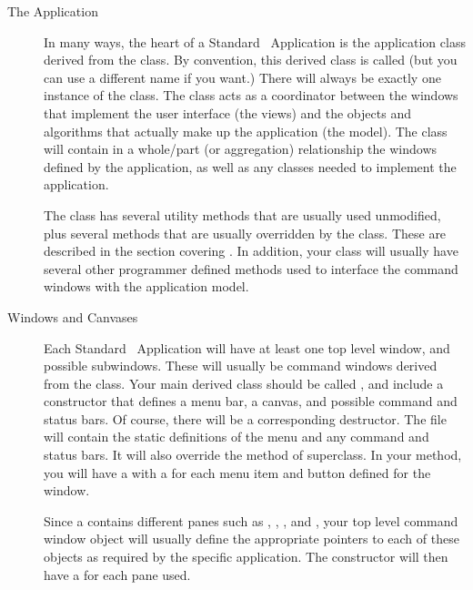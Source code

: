 \begin{description}

\item [The Application]

In many ways, the heart of a Standard \V\ Application is the
application class derived from the  class. By
convention, this derived class is called  (but you
can use a different name if you want.) There will always be
exactly one instance of the  class.  The 
class acts as a coordinator between the windows that implement
the user interface (the views) and the objects and algorithms
that actually make up the application (the model).  The 
class will contain in a whole/part (or aggregation) relationship
the windows defined by the application, as well as any classes
needed to implement the application.

The  class has several utility methods that are
usually used unmodified, plus several methods that are usually
overridden by the  class.  These are described in the
section covering .  In addition, your 
class will usually have several other programmer defined methods
used to interface the command windows with the application model.

\item [Windows and Canvases]

Each Standard \V\ Application will have at least one top level
window, and possible subwindows. These will usually be
command windows derived from the  class. Your
main derived class should be called , and
include a constructor that defines a menu bar, a canvas, and
possible command and status bars. Of course, there will be a
corresponding destructor. The  file will contain the
static definitions of the menu and any command and status bars.
It will also override the  method of 
superclass. In your  method, you will have a
 with a  for each menu item and button
defined for the window.

Since a  contains different panes such as
, , , and
, your top level command window object will
usually define the appropriate pointers to each of these objects
as required by the specific application. The 
constructor will then have a  for each pane used.


\end{description}
